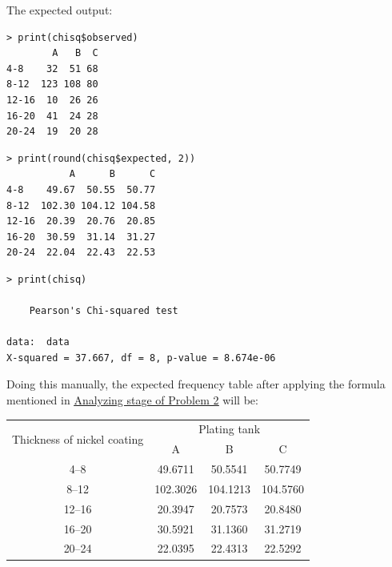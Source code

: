 \documentclass[a4paper]{article}
\numberwithin{equation}{section}
\begin{document}
The expected output:
\begin{mdframed}[leftline=false,rightline=false,backgroundcolor=teal!10,nobreak=true]
  \begin{verbatim}
> print(chisq$observed)
        A   B  C
4-8    32  51 68
8-12  123 108 80
12-16  10  26 26
16-20  41  24 28
20-24  19  20 28
  \end{verbatim}
  \begin{verbatim}
> print(round(chisq$expected, 2))
           A      B      C
4-8    49.67  50.55  50.77
8-12  102.30 104.12 104.58
12-16  20.39  20.76  20.85
16-20  30.59  31.14  31.27
20-24  22.04  22.43  22.53
  \end{verbatim}
  \begin{verbatim}
> print(chisq)

	Pearson's Chi-squared test

data:  data
X-squared = 37.667, df = 8, p-value = 8.674e-06
  \end{verbatim}
\end{mdframed}

Doing this manually, the expected frequency table after applying the formula mentioned in \hyperref[p2:anal]{\underline{Analyzing stage of Problem 2}} will be:

\begin{center}
  \begin{tabular}{cccc}
    \toprule
    \multirow{2}{*}{Thickness of nickel coating} & \multicolumn{3}{c}{Plating tank}                       \\
    \cmidrule(lr){2-4}
                                                 & A                                & B        & C        \\
    \midrule
    4--8                                         & 49.6711                          & 50.5541  & 50.7749  \\
    8--12                                        & 102.3026                         & 104.1213 & 104.5760 \\
    12--16                                       & 20.3947                          & 20.7573  & 20.8480  \\
    16--20                                       & 30.5921                          & 31.1360  & 31.2719  \\
    20--24                                       & 22.0395                          & 22.4313  & 22.5292  \\
    \bottomrule
  \end{tabular}
\end{center}
\end{document}
